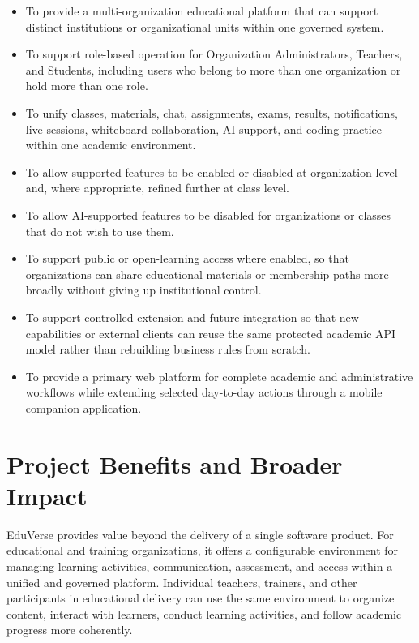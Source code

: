 \begin{itemize}
  \item To provide a multi-organization educational platform that can support
    distinct institutions or organizational units within one governed system.
  \item To support role-based operation for Organization Administrators,
    Teachers, and Students, including users who belong to more than one
    organization or hold more than one role.
  \item To unify classes, materials, chat, assignments, exams, results,
    notifications, live sessions, whiteboard collaboration, AI support, and
    coding practice within one academic environment.
  \item To allow supported features to be enabled or disabled at organization
    level and, where appropriate, refined further at class level.
  \item To allow AI-supported features to be disabled for organizations or
    classes that do not wish to use them.
  \item To support public or open-learning access where enabled, so that
    organizations can share educational materials or membership paths more
    broadly without giving up institutional control.
  \item To support controlled extension and future integration so that new
    capabilities or external clients can reuse the same protected academic API
    model rather than rebuilding business rules from scratch.
  \item To provide a primary web platform for complete academic and
    administrative workflows while extending selected day-to-day actions
    through a mobile companion application.
\end{itemize}

\section{Project Benefits and Broader Impact}\label{sec:team_goals}

EduVerse provides value beyond the delivery of a single software product. For
educational and training organizations, it offers a configurable environment
for managing learning activities, communication, assessment, and access within
a unified and governed platform. Individual teachers, trainers, and other
participants in educational delivery can use the same environment to organize
content, interact with learners, conduct learning activities, and follow
academic progress more coherently.


